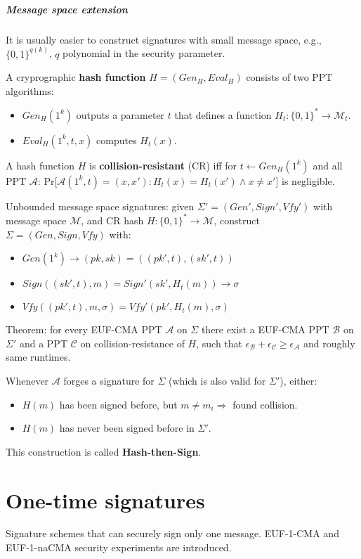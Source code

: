 \documentclass[oneside]{book}
\newcommand{\cA}[0]{\mathcal{A}}
\newcommand{\cB}[0]{\mathcal{B}}
\newcommand{\cC}[0]{\mathcal{C}}
\begin{document}
\paragraph{Message space extension}
It is usually easier to construct signatures with small message space, e.g., $\{0,1\}^{q(k)}$, $q$ polynomial in the security parameter.

A cryprographic \textbf{hash function} $H = (Gen_H, Eval_H)$ consists of two PPT algorithms:
\begin{itemize}
    \item $Gen_H(1^k)$ outputs a parameter $t$ that defines a function $H_t: \{0,1\}^* \rightarrow \mathcal{M}_t$.
    \item $Eval_H(1^k, t, x)$ computes $H_t(x)$.
\end{itemize}

A hash function $H$ is \textbf{collision-resistant} (CR) iff for $t \leftarrow Gen_H(1^k)$ and all PPT $\cA$: Pr[$\cA(1^k, t) = (x, x') : H_t(x) = H_t(x') \land x \ne x'$] is negligible.

Unbounded message space signatures: given $\Sigma' = (Gen', Sign', Vfy')$ with message space $\mathcal{M}$, and CR hash $H: \{0,1\}^* \rightarrow \mathcal{M}$, construct $\Sigma = (Gen, Sign, Vfy)$ with:
\begin{itemize}
    \item $Gen(1^k) \rightarrow (pk, sk) = ((pk', t), (sk', t))$
    \item $Sign((sk', t), m) = Sign'(sk', H_t(m)) \rightarrow \sigma$
    \item $Vfy((pk', t), m, \sigma) = Vfy'(pk', H_t(m), \sigma)$
\end{itemize}

Theorem: for every EUF-CMA PPT $\cA$ on $\Sigma$ there exist a EUF-CMA PPT $\cB$ on $\Sigma'$ and a PPT $\cC$ on collision-resistance of $H$, such that $\epsilon_\cB + \epsilon_\cC \ge \epsilon_\cA$ and roughly same runtimes.

Whenever $\cA$ forges a signature for $\Sigma$ (which is also valid for $\Sigma'$), either:
\begin{itemize}
    \item $H(m)$ has been signed before, but $m \ne m_i \Rightarrow$ found collision.
    \item $H(m)$ has never been signed before in $\Sigma'$.
\end{itemize}

This construction is called \textbf{Hash-then-Sign}.

\chapter{One-time signatures}
Signature schemes that can securely sign only one message.
EUF-1-CMA and EUF-1-naCMA security experiments are introduced.
\end{document}
